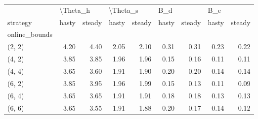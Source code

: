 \begin{tabular}{lrrrrrrrr}
\toprule
{} & \multicolumn{2}{l}{\textbackslash Theta\_h} & \multicolumn{2}{l}{\textbackslash Theta\_s} & \multicolumn{2}{l}{B\_d} & \multicolumn{2}{l}{B\_e} \\
strategy &    hasty & steady &    hasty & steady & hasty & steady & hasty & steady \\
online\_bounds &          &        &          &        &       &        &       &        \\
\midrule
(2, 2)        &     4.20 &   4.40 &     2.05 &   2.10 &  0.31 &   0.31 &  0.23 &   0.22 \\
(4, 2)        &     3.85 &   3.85 &     1.96 &   1.96 &  0.15 &   0.16 &  0.11 &   0.11 \\
(4, 4)        &     3.65 &   3.60 &     1.91 &   1.90 &  0.20 &   0.20 &  0.14 &   0.14 \\
(6, 2)        &     3.85 &   3.95 &     1.96 &   1.99 &  0.15 &   0.13 &  0.11 &   0.09 \\
(6, 4)        &     3.65 &   3.65 &     1.91 &   1.91 &  0.18 &   0.18 &  0.13 &   0.13 \\
(6, 6)        &     3.65 &   3.55 &     1.91 &   1.88 &  0.20 &   0.17 &  0.14 &   0.12 \\
\bottomrule
\end{tabular}
